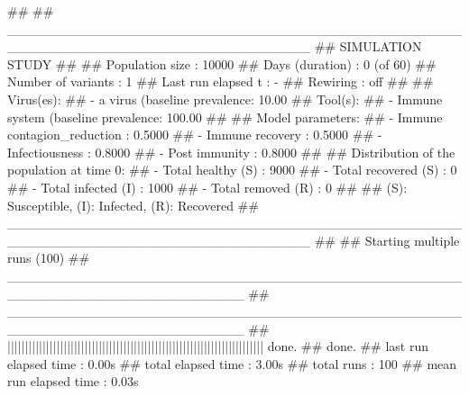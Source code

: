 
\begin{DoxyCode}{0}

\end{DoxyCode}
 \begin{DoxyVerb}## 
## ________________________________________________________________________________
## SIMULATION STUDY
## 
## Population size    : 10000
## Days (duration)    : 0 (of 60)
## Number of variants : 1
## Last run elapsed t : -
## Rewiring           : off
## 
## Virus(es):
##  - a virus (baseline prevalence: 10.00%
## Tool(s):
##  - Immune system (baseline prevalence: 100.00%
## 
## Model parameters:
##  - Immune contagion_reduction : 0.5000
##  - Immune recovery            : 0.5000
##  - Infectiousness             : 0.8000
##  - Post immunity              : 0.8000
## 
## Distribution of the population at time 0:
##  - Total healthy (S)   : 9000
##  - Total recovered (S) : 0
##  - Total infected (I)  : 1000
##  - Total removed (R)   : 0
## 
## (S): Susceptible, (I): Infected, (R): Recovered
## ________________________________________________________________________________
## 
## Starting multiple runs (100)
## _________________________________________________________________________
## _________________________________________________________________________
## ||||||||||||||||||||||||||||||||||||||||||||||||||||||||||||||||||||||||| done.
##  done.
## last run elapsed time : 0.00s
## total elapsed time    : 3.00s
## total runs            : 100
## mean run elapsed time : 0.03s
\end{DoxyVerb}
 
\begin{DoxyCode}{0}
\DoxyCodeLine{  ))}

\end{DoxyCode}



\begin{DoxyCode}{0}

\end{DoxyCode}


 